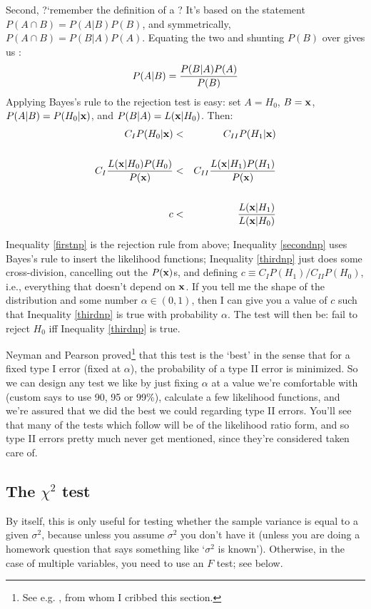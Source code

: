 Second, ?`remember the definition of a ? It's based on the
statement $P(A\cap B)=P(A|B)P(B)$, and symmetrically, $P(A\cap B)=P(B|A)P(A)$.  Equating
the two and shunting $P(B)$ over gives us : $$P(A|B)={P(B|A) P(A)\over P(B)}$$
Applying Bayes's rule to the rejection test is easy: set $A=H_0$, $B={\bf x}$,
$P(A|B)=P(H_0|{\bf x})$, and $P(B|A)=L({\bf x}|H_0)$. Then:
\begin{eqnarray}
C_I P(H_0|{\bf x})&<&C_{II} P(H_1|{\bf x})\label{firstnp}\\
\nonumber\\
C_I {L({\bf x}|H_0)P(H_0)\over P({\bf x})}&<& C_{II} {L({\bf x}|H_1)P(H_1)\over P({\bf x})}\label{secondnp}\\
\nonumber\\
c&<& {L({\bf x}|H_1)\over L({\bf x}|H_0)}\label{thirdnp}
\end{eqnarray}

Inequality \ref{firstnp} is the rejection rule from above; Inequality
\ref{secondnp} uses Bayes's rule to insert the likelihood functions;
Inequality \ref{thirdnp} just does some cross-division, cancelling out the
$P({\bf x})$s, and defining $c\equiv C_IP(H_1)/C_{II}P(H_0)$, i.e., everything
that doesn't depend on ${\bf x}$. If you tell me the shape of the distribution
and some number $\alpha\in(0,1)$, then I can give you a value of $c$
such that Inequality \ref{thirdnp} is true with probability
$\alpha$. The test will then be: fail to reject $H_0$ iff Inequality
\ref{thirdnp} is true.

Neyman and Pearson proved\footnote{See
e.g. \cite[189--191]{amemiya:ez}, from whom I cribbed
this section.}  that this test is the `best' in the sense that for a
fixed type I error (fixed at $\alpha$), the probability of a type II
error is minimized. So we can design any test we like by just fixing $\alpha$
at a value we're comfortable with (custom says to use
90, 95 or 99\%), calculate a few likelihood functions, and we're assured
that we did the best we could regarding type II errors. You'll see that
many of the tests which follow will be of the likelihood ratio form,
and so type II errors pretty much never get mentioned, since they're
considered taken care of.




\subsection{The $\chi^2$ test }

By itself, this is only useful for testing whether the sample variance
is equal to a given $\sigma^2$, because unless you assume $\sigma^2$ you
don't have it (unless you are doing a homework question that says something like `$\sigma^2$
is known'). Otherwise, in the case of multiple variables, you need to use
an $F$ test; see below.


